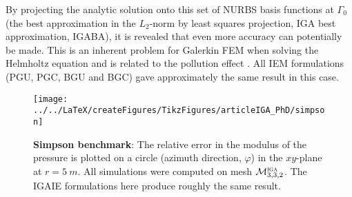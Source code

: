 By projecting the analytic solution onto this set of NURBS basis functions at $\Gamma_0$ (the best approximation in the $L_2$-norm by least squares projection, IGA best approximation, IGABA), it is revealed that even more accuracy can potentially be made. This is an inherent problem for Galerkin FEM when solving the Helmholtz equation and is related to the pollution effect \cite{Babuska1995agf}. All IEM formulations (PGU, PGC, BGU and BGC) gave approximately the same result in this case.
\begin{figure}
	\centering
	\texttt{[image: ../../LaTeX/createFigures/TikzFigures/articleIGA\_PhD/simpson]}
	\caption{\textbf{Simpson benchmark}: The relative error in the modulus of the pressure is plotted on a circle (azimuth direction, $\varphi$) in the $xy$-plane at $r=\SI{5}{m}$. All simulations were computed on mesh ${\cal M}_{3,3,2}^{\textsc{iga}}$. The IGAIE formulations here produce roughly the same result.}
	\label{Fig2:simpsonPlot}
\end{figure}

